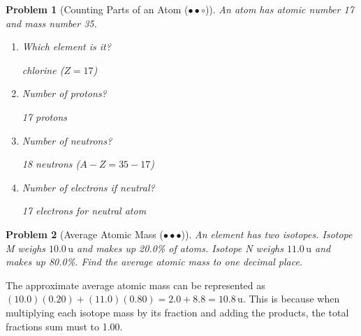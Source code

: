 \documentclass[a4paper,11pt]{article}
\newcommand{\medium}{(\ensuremath{\bullet \bullet \circ})}
\newcommand{\hard}{(\ensuremath{\bullet \bullet \bullet})}
\theoremstyle{listprobstyle}
\newtheorem{problem}{Problem}
\newenvironment{solution}
    {\par\begingroup\color{BrickRed}}
    {\par\endgroup}
\begin{document}
\begin{problem}[Counting Parts of an Atom \medium]
An atom has atomic number 17 and mass number 35.
\vspace{-0.6\baselineskip}
\begin{enumerate}[label=\alph*),itemsep=0pt,parsep=0pt,topsep=0pt]
\item Which element is it?
\begin{solution}
chlorine ($Z = 17$)
\end{solution}
\vspace{0.5\baselineskip}

\item Number of protons?
\begin{solution}
17 protons
\end{solution}
\vspace{0.5\baselineskip}

\item Number of neutrons?
\begin{solution}
18 neutrons ($A - Z = 35 - 17$)
\end{solution}
\vspace{0.5\baselineskip}

\item Number of electrons if neutral?
\begin{solution}
17 electrons for neutral atom
\end{solution}
\vspace{0.5\baselineskip}
\end{enumerate}
\end{problem}


\begin{problem}[Average Atomic Mass \hard]
An element has two isotopes. Isotope M weighs $10.0\,\mathrm{u}$
and makes up 20.0\% of atoms. Isotope N weighs $11.0\,\mathrm{u}$
and makes up 80.0\%. Find the average atomic mass to one decimal
place.
\end{problem}
\vspace{-\baselineskip}
\begin{solution}
The approximate average atomic mass can be represented as
$(10.0)(0.20) + (11.0)(0.80) = 2.0 + 8.8 = 10.8\,\mathrm{u}$.
This is because when multiplying each isotope mass by its fraction and
adding the products, the total fractions sum must to 1.00.
\end{solution}
\end{document}
